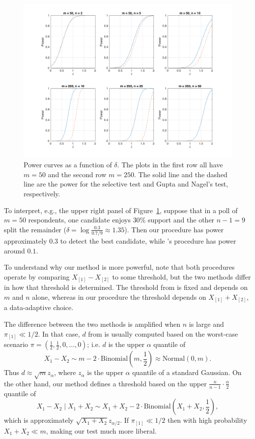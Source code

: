 \documentclass[11pt]{article}
\theoremstyle{definition}
\theoremstyle{custom}
\begin{document}
\begin{figure}[htbp]
\begin{center}
\includegraphics[width = \textwidth]{plotMultinomialPower}
\end{center}
\caption{Power curves as a function of $\delta$. The plots in the first row all have $m = 50$ and the second row $m = 250$. The solid line and the dashed line are the power for the selective test and Gupta and Nagel's test, respectively.}
\label{fig:power}
\end{figure}

To interpret, e.g., the upper right panel of Figure~\ref{fig:power}, suppose that in a poll of $m = 50$ respondents, one candidate enjoys $30\%$ support and the other $n - 1 = 9$ split the remainder ($\delta = \log\frac{0.3}{0.7 / 9} \approx 1.35$). Then our procedure has power approximately $0.3$ to detect the best candidate, while \citeauthor{Gupta:1967wg}'s procedure has power around $0.1$.

To understand why our method is more powerful, note that both procedures operate by comparing $X_{[1]}-X_{[2]}$ to some threshold, but the two methods differ in how that threshold is determined. The threshold from \citet{Gupta:1967wg} is fixed and depends on $m$ and $n$ alone, whereas in our procedure the threshold depends on $X_{[1]}+X_{[2]}$, a data-adaptive choice. 

The difference between the two methods is amplified when $n$ is large and $\pi_{[1]} \ll 1/2$. In that case, $d$ from \citeauthor{Gupta:1967wg} is usually computed based on the worst-case scenario $\pi = \left(\frac{1}{2}, \frac{1}{2}, 0, \ldots, 0\right)$; i.e. $d$ is the upper $\alpha$ quantile of
$$X_1 - X_2 \sim m - 2 \cdot \text{Binomial}\left(m, \frac{1}{2}\right) \approx \text{Normal}\left(0, m\right).$$
Thus $d \approx \sqrt{m} z_\alpha$, where $z_\alpha$ is the upper $\alpha$ quantile of a standard Gaussian. On the other hand, our method defines a threshold based on the upper $\frac{n}{n-1} \cdot \frac{\alpha}{2}$ quantile of
$$X_1 - X_2 \mid X_1 + X_2 \sim X_1 + X_2 - 2 \cdot \text{Binomial}\left(X_1 + X_2, \frac{1}{2}\right),$$
which is approximately $\sqrt{X_1 + X_2} z_{\alpha / 2}$. If $\pi_{[1]} \ll 1/2$ then with high probability $X_1 + X_2 \ll  m$, making our test much more liberal.
\end{document}
